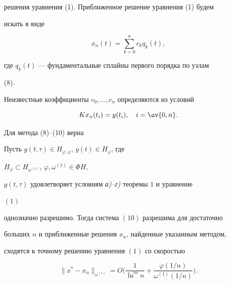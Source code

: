 решения уравнения (1). Приближенное решение уравнения (1) будем 


искать в виде


\begin{equation}


x_n(t)=\sum^n_{k=0}c_k q_k(t),


\end{equation}


где $q_k(t)$ --- фундаментальные сплайны первого порядка по узлам 


(8). 


Неизвестные коэффициенты $c_0,\dotsc,c_n$ определяются из условий


\begin{equation}


K x_n(t_i)=y(t_i),\quad i=\ov{0,n}.


\end{equation}


Для метода (8)--(10) верна





\begin{thm}


Пусть $g(t,\tau)\in H_{\varphi,\varphi}$, $y(t)\in H_\varphi$, где 


$H_\varphi\subset H_{\omega^{(1)}}$, $\varphi,\omega^{(1)}\in \Phi H$,


$g(t,\tau)$ удовлетворяет условиям {\em а)--г)} теоремы $1$ и уравнение 


$(1)$ 


однозначно разрешимо. Тогда система $(10)$ разрешима для достаточно


больших $n$ и приближенные решения $x_n$, найденные указанным методом, 


сходятся к точному решению уравнения $(1)$ со скоростью


$$


\|x^*-x_n\|_{\omega^{(1)}}=O\bigg(\frac{1}{\ln^m n}+


\frac{\varphi(1/n)}{\omega^{(1)}(1/n)}\bigg).


$$


\end{thm}








